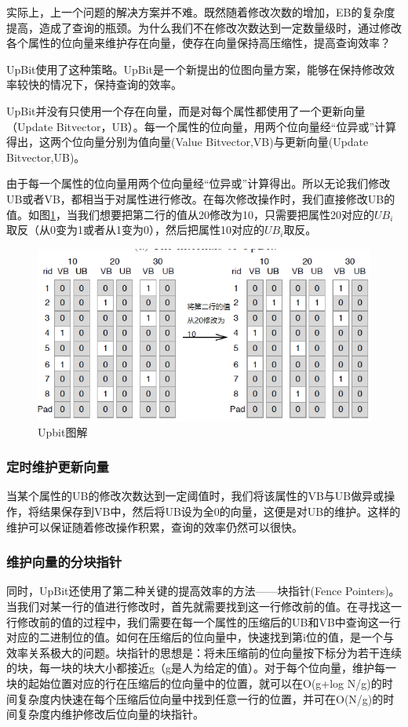 \documentclass[11pt, a4paper]{article}
\begin{document}
  实际上，上一个问题的解决方案并不难。既然随着修改次数的增加，EB的复杂度提高，造成了查询的瓶颈。为什么我们不在修改次数达到一定数量级时，通过修改各个属性的位向量来维护存在向量，使存在向量保持高压缩性，提高查询效率？

  UpBit使用了这种策略。UpBit是一个新提出的位图向量方案，能够在保持修改效率较快的情况下，保持查询的效率。

  UpBit并没有只使用一个存在向量，而是对每个属性都使用了一个更新向量（Update Bitvector，UB）。每一个属性的位向量，用两个位向量经“位异或”计算得出，这两个位向量分别为值向量(Value Bitvector,VB)与更新向量(Update Bitvector,UB)。

  由于每一个属性的位向量用两个位向量经“位异或”计算得出。所以无论我们修改UB或者VB，都相当于对属性进行修改。在每次修改操作时，我们直接修改UB的值。如图\ref{fig:upbit}，当我们想要把第二行的值从20修改为10，只需要把属性20对应的$UB_i$取反（从0变为1或者从1变为0），然后把属性10对应的$UB_i$取反。

  \begin{figure}[H]
    \begin{center}
      \includegraphics[width=5in]{img/upbit.png}
      \caption{Upbit图解}
      \label{fig:upbit}
    \end{center}
  \end{figure}


  \subsubsection{定时维护更新向量}
  当某个属性的UB的修改次数达到一定阈值时，我们将该属性的VB与UB做异或操作，将结果保存到VB中，然后将UB设为全0的向量，这便是对UB的维护。这样的维护可以保证随着修改操作积累，查询的效率仍然可以很快。

  \subsubsection{维护向量的分块指针}
  同时，UpBit还使用了第二种关键的提高效率的方法——块指针(Fence Pointers)。当我们对某一行的值进行修改时，首先就需要找到这一行修改前的值。在寻找这一行修改前的值的过程中，我们需要在每一个属性的压缩后的UB和VB中查询这一行对应的二进制位的值。如何在压缩后的位向量中，快速找到第i位的值，是一个与效率关系极大的问题。块指针的思想是：将未压缩前的位向量按下标分为若干连续的块，每一块的块大小都接近g（g是人为给定的值）。对于每个位向量，维护每一块的起始位置对应的行在压缩后的位向量中的位置，就可以在O(g+log N/g)的时间复杂度内快速在每个压缩后位向量中找到任意一行的位置，并可在O(N/g)的时间复杂度内维护修改后位向量的块指针。
\end{document}
